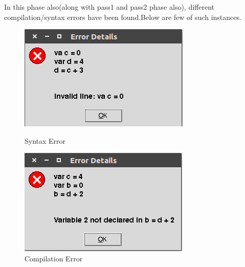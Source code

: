 \documentclass[12pt]{article}
\begin{document}
In this phase also(along with pass1 and pass2 phase also), different compilation/syntax errors have been found.Below are few of such instances.
\begin{figure}[H]
   \begin{minipage}{0.48\textwidth}
     \centering
     \includegraphics[width=.7\linewidth]{error_va.png}
     \caption{\label{fig:err_va}Syntax Error}
   \end{minipage}\hfill
   \begin {minipage}{0.48\textwidth}
     \centering
     \includegraphics[width=.7\linewidth]{err_dec.png}
      \caption{\label{fig:err_dc}Compilation Error}
   \end{minipage}
\end{figure}
\end{document}
